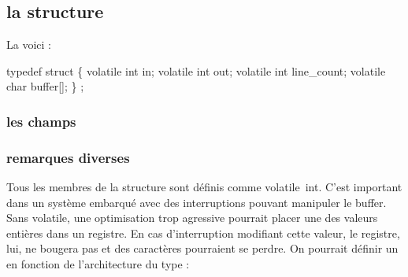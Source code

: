 \documentclass{scrartcl}%
\begin{document}
\nwendcode{}\nwdocspar
\subsection{la structure}
La voici :

\nwenddocs{}\endmoddef\nwstartdeflinemarkup\nwenddeflinemarkup

typedef struct \{
    volatile int in;
    volatile int out;
    volatile int line_count;
    volatile char buffer[];
\} ;

\nwendcode{}\nwdocspar
\subsubsection{les champs}
\subsubsection{remarques diverses}
Tous les membres de la structure sont définis comme {\Tt{}volatile\ int\nwendquote}. C'est important dans un système embarqué avec des interruptions pouvant manipuler le buffer. Sans {\Tt{}volatile\nwendquote}, une optimisation trop agressive pourrait placer une des valeurs entières dans un registre. En cas d'interruption modifiant cette valeur, le registre, lui, ne bougera pas et des caractères pourraient se perdre.
On pourrait définir un {\Tt{}\nwendquote} en fonction de l'architecture du type :

\nwenddocs{}\endmoddef\nwstartdeflinemarkup{}\nwenddeflinemarkup
\end{document}
